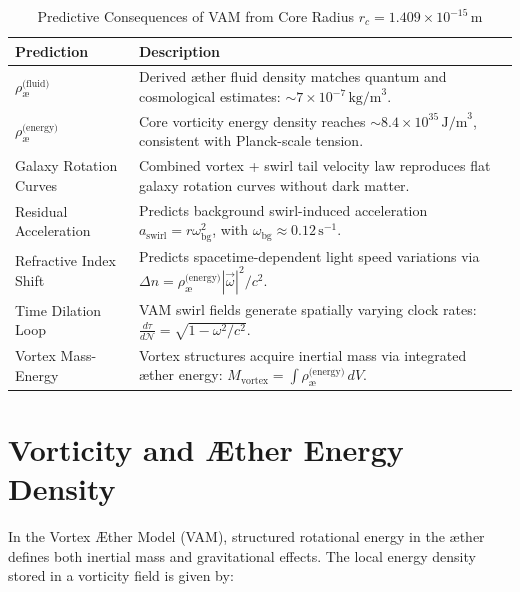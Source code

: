\documentclass[12pt]{article}
\begin{document}
    \begin{table}[H]
        \footnotesize
        \centering
        \renewcommand{\arraystretch}{1.2}
        \begin{tabular}{|l|p{10.5cm}|}
            \hline
            \textbf{Prediction} & \textbf{Description} \\
            \hline
            \(\rho_{\text{\ae}}^{\text{(fluid)}}\) & Derived æther fluid density matches quantum and cosmological estimates: \( \sim 7 \times 10^{-7} \, \text{kg/m}^3 \). \\
            \hline
            \(\rho_{\text{\ae}}^{\text{(energy)}}\) & Core vorticity energy density reaches \( \sim 8.4 \times 10^{35} \, \text{J/m}^3 \), consistent with Planck-scale tension. \\
            \hline
            Galaxy Rotation Curves & Combined vortex + swirl tail velocity law reproduces flat galaxy rotation curves without dark matter. \\
            \hline
            Residual Acceleration & Predicts background swirl-induced acceleration \( a_{\text{swirl}} = r \omega_{\text{bg}}^2 \), with \( \omega_{\text{bg}} \approx 0.12 \, \text{s}^{-1} \). \\
            \hline
            Refractive Index Shift & Predicts spacetime-dependent light speed variations via \( \Delta n = \rho_{\text{\ae}}^{\text{(energy)}} |\vec{\omega}|^2 / c^2 \). \\
            \hline
            Time Dilation Loop & VAM swirl fields generate spatially varying clock rates: \( \frac{d\tau}{d\mathcal{N}} = \sqrt{1 - \omega^2/c^2} \). \\
            \hline
            Vortex Mass-Energy & Vortex structures acquire inertial mass via integrated æther energy: \( M_{\text{vortex}} = \int \rho_{\text{\ae}}^{\text{(energy)}} \, dV \). \\
            \hline
        \end{tabular}
        \caption{Predictive Consequences of VAM from Core Radius \( r_c = 1.409 \times 10^{-15} \, \text{m} \)}
        \label{tab:vam_predictions}
    \end{table}


    \section{Vorticity and Æther Energy Density}

    In the Vortex \AE{}ther Model (VAM), structured rotational energy in the æther defines both inertial mass and gravitational effects. The local energy density stored in a vorticity field is given by:
\end{document}
